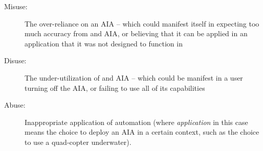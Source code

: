     \begin{description}
        \item [Misuse:] The over-reliance on an AIA -- which could manifest itself in expecting too much accuracy from and AIA, or believing that it can be applied in an application that it was not designed to function in
        \item [Disuse:] The under-utilization of and AIA -- which could be manifest in a user turning off the AIA, or failing to use all of its capabilities 
        \item [Abuse:] Inappropriate application of automation (where \emph{application} in this case means the choice to deploy an AIA in a certain context, such as the choice to use a quad-copter underwater).
    \end{description}

